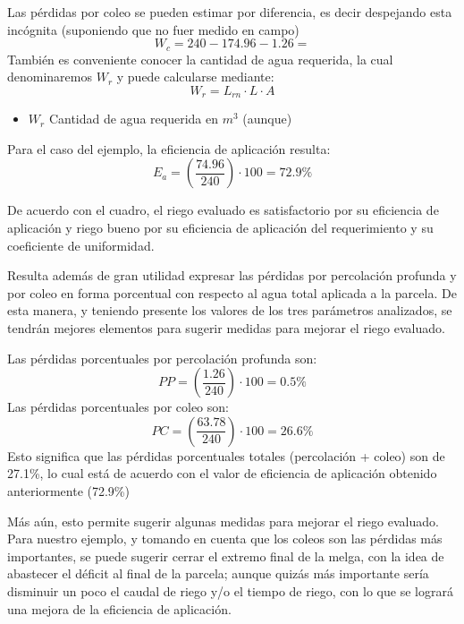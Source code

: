 \begin{example}
Las pérdidas por coleo se pueden estimar por diferencia, es decir despejando esta incógnita (suponiendo que no fuer medido en campo)
\begin{equation*}
    W_c = 240 - 174.96 - 1.26 =
\end{equation*}
También es conveniente conocer la cantidad de agua requerida, la cual denominaremos $W_r$ y puede calcularse mediante:
\begin{equation}
    W_r = L_{rn} \cdot L \cdot A
\end{equation}
\begin{notation}
    \begin{itemize}
        \item $W_r$ Cantidad de agua requerida en $m^3$ (aunque)
    \end{itemize}
\end{notation}

Para el caso del ejemplo, la eficiencia de aplicación resulta:
\begin{equation}
    E_a = \left(\frac{74.96}{240}\right) \cdot 100 = 72.9\%
\end{equation}

De acuerdo con el cuadro, el riego evaluado es satisfactorio por su eficiencia de aplicación y riego bueno por su eficiencia de aplicación del requerimiento y su coeficiente de uniformidad.

Resulta además de gran utilidad expresar las pérdidas por percolación profunda y por coleo en forma porcentual con respecto al agua total aplicada a la parcela. De esta manera, y teniendo presente los valores de los tres parámetros analizados, se tendrán mejores elementos para sugerir medidas para mejorar el riego evaluado. 

Las pérdidas porcentuales por percolación profunda son:
\begin{equation*}
    PP = \left(\frac{1.26}{240}\right) \cdot 100 = 0.5\%
\end{equation*}
Las pérdidas porcentuales por coleo son:
\begin{equation*}
    PC = \left(\frac{63.78}{240}\right) \cdot 100 = 26.6\%
\end{equation*}
Esto significa que las pérdidas porcentuales totales (percolación + coleo) son de 27.1\%, lo cual está de acuerdo con el valor de eficiencia de aplicación obtenido anteriormente (72.9\%)
\end{example}
Más aún, esto permite sugerir algunas medidas para mejorar el riego evaluado. Para nuestro ejemplo, y tomando en cuenta que los coleos son las pérdidas más importantes, se puede sugerir cerrar el extremo final de la melga, con la idea de abastecer el déficit al final de la parcela; aunque quizás más importante sería disminuir un poco el caudal de riego y/o el tiempo de riego, con lo que se logrará una mejora de la eficiencia de aplicación.
